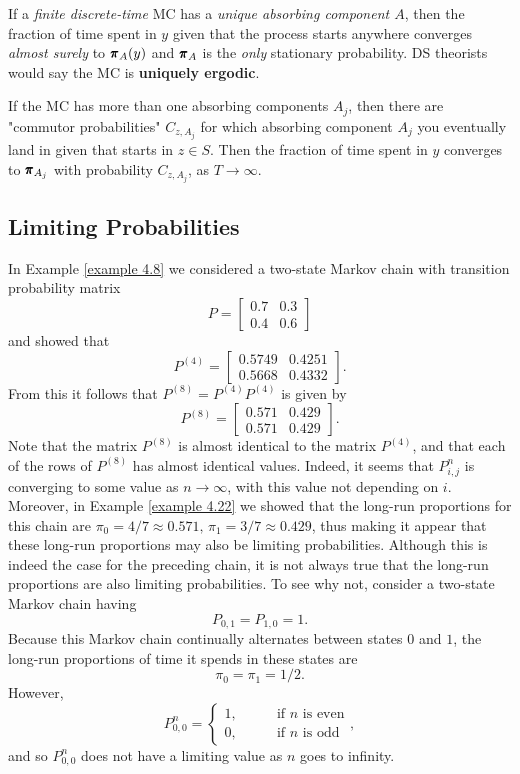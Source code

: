 \begin{remark}
    If a \textit{finite discrete-time} MC has a \textit{unique absorbing component $A$}, then the fraction of time spent in $y$ given that the process starts anywhere converges \textit{almost surely} to $\pmb{\pi}_A (y)$ and $\pmb{\pi}_A$ is the \textit{only} stationary probability. DS theorists would say the MC is \textbf{uniquely ergodic}.
\end{remark}

\begin{remark}
    If the MC has more than one absorbing components $A_j$, then there are "commutor probabilities" $C_{z,A_j}$ for which absorbing component $A_j$ you eventually land in given that starts in $z \in S$. Then the fraction of time spent in $y$ converges to $\pmb{\pi}_{A_j}$ with probability $C_{z, A_j}$, as $T \to \infty$.
\end{remark}




\subsection{Limiting Probabilities}\label{Limiting Probabilities}

In Example \ref{example 4.8} we considered a two-state Markov chain with transition probability matrix
$$
P = 
\begin{bmatrix}
    0.7 & 0.3 \\ 
    0.4 & 0.6
\end{bmatrix}
$$
and showed that 
$$
P^{(4)} = 
\begin{bmatrix}
    0.5749 & 0.4251 \\ 
    0.5668 & 0.4332
\end{bmatrix}.
$$
From this it follows that $P^{(8)} = P^{(4)}  P^{(4)} $ is given by 
$$
P^{(8)} = 
\begin{bmatrix}
    0.571 & 0.429 \\ 
    0.571 & 0.429 
\end{bmatrix}.
$$
Note that the matrix $P^{(8)}$ is almost identical to the matrix $P^{(4)}$, and that each of the
rows of $P^{(8)}$ has almost identical values. Indeed, it seems that $P_{i,j}^n$ is converging to
some value as $n \to \infty$, with this value not depending on $i$. Moreover, in Example \ref{example 4.22}
we showed that the long-run proportions for this chain are $\pi_0 = 4/7 ≈ 0.571,\, \pi_1 = 3/7 ≈ 0.429$, thus making it appear that these long-run proportions may also be limiting probabilities. Although this is indeed the case for the preceding chain, it is not
always true that the long-run proportions are also limiting probabilities. To see why
not, consider a two-state Markov chain having
$$
P_{0,1} = P_{1,0} = 1.
$$
Because this Markov chain continually alternates between states $0$ and $1$, the long-run
proportions of time it spends in these states are
$$
\pi_0 = \pi_1 = 1/2.$$
However, 
$$
P^n_{0,0} = \begin{cases}
    1, \qquad &\text{if $n$ is even} \\ 
    0, \qquad &\text{if $n$ is odd}
\end{cases},
$$
and so $P^n_{0,0}$ does not have a limiting value as $n$ goes to infinity. 

